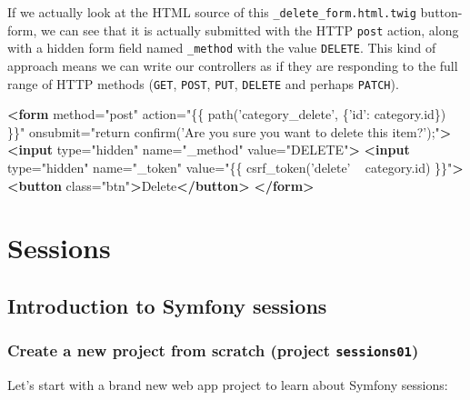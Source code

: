 \documentclass[a4paperpaper,openright]{book}
\newenvironment{Shaded}{}{}
\newcommand{\KeywordTok}[1]{\textcolor[rgb]{0.00,0.44,0.13}{\textbf{#1}}}
\newcommand{\NormalTok}[1]{#1}
\newcommand{\OtherTok}[1]{\textcolor[rgb]{0.00,0.44,0.13}{#1}}
\newcommand{\StringTok}[1]{\textcolor[rgb]{0.25,0.44,0.63}{#1}}
\begin{document}
If we actually look at the HTML source of this
\texttt{\_delete\_form.html.twig} button-form, we can see that it is
actually submitted with the HTTP \texttt{post} action, along with a
hidden form field named \texttt{\_method} with the value
\texttt{DELETE}. This kind of approach means we can write our
controllers as if they are responding to the full range of HTTP methods
(\texttt{GET}, \texttt{POST}, \texttt{PUT}, \texttt{DELETE} and perhaps
\texttt{PATCH}).

\begin{Shaded}
\begin{Highlighting}[]
    \KeywordTok{<form}\OtherTok{ method=}\StringTok{"post"}\OtherTok{ action=}\StringTok{"\{\{ path('category_delete', \{'id': category.id\}) \}\}"}\OtherTok{ onsubmit=}\StringTok{"return confirm('Are you sure you want to delete this item?');"}\KeywordTok{>}
        \KeywordTok{<input}\OtherTok{ type=}\StringTok{"hidden"}\OtherTok{ name=}\StringTok{"_method"}\OtherTok{ value=}\StringTok{"DELETE"}\KeywordTok{>}
        \KeywordTok{<input}\OtherTok{ type=}\StringTok{"hidden"}\OtherTok{ name=}\StringTok{"_token"}\OtherTok{ value=}\StringTok{"\{\{ csrf_token('delete' ~ category.id) \}\}"}\KeywordTok{>}
        \KeywordTok{<button}\OtherTok{ class=}\StringTok{"btn"}\KeywordTok{>}\NormalTok{Delete}\KeywordTok{</button>}
    \KeywordTok{</form>}
\end{Highlighting}
\end{Shaded}

\part{Sessions}

\hypertarget{introduction-to-symfony-sessions}{%
\chapter{Introduction to Symfony
sessions}\label{introduction-to-symfony-sessions}}

\hypertarget{create-a-new-project-from-scratch-project-sessions01}{%
\section{\texorpdfstring{Create a new project from scratch (project
\texttt{sessions01})}{Create a new project from scratch (project sessions01)}}\label{create-a-new-project-from-scratch-project-sessions01}}

Let's start with a brand new web app project to learn about Symfony
sessions:
\end{document}
